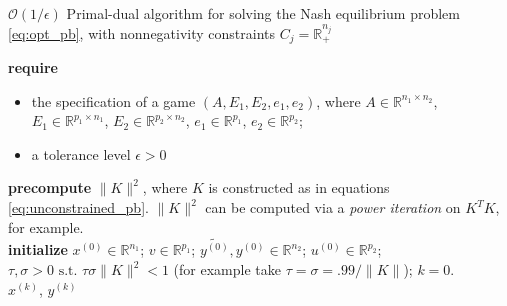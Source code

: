 \documentclass{article} %
\begin{document}
\begin{algorithm}[htb]
  \caption{$\mathcal{O}(1/\epsilon)$ Primal-dual algorithm for solving the Nash equilibrium problem \eqref{eq:opt_pb}, with nonnegativity constraints $C_j = \mathbb{R}^{n_j}_+$}
  \textbf{require}
  \begin{itemize}
    \item the specification of a game $(A, E_1, E_2, e_1, e_2)$, where $A \in \mathbb{R}^{n_1 \times n_2}$,
  $E_1 \in \mathbb{R}^{p_1 \times n_1}$, $E_2 \in \mathbb{R}^{p_2 \times n_2}$, $e_1 \in \mathbb{R}^{p_1}$, $e_2 \in \mathbb{R}^{p_2}$;
      \item a tolerance level $\epsilon > 0$
  \end{itemize}
  \textbf{precompute} $\|K\|^2$, where $K$ is constructed as in equations \eqref{eq:unconstrained_pb}. $\|K\|^2$ can be computed via a \textit{power iteration} on $K^TK$, for example.\\
  \textbf{initialize}
  $x^{(0)} \in \mathbb{R}^{n_1}$; $v \in \mathbb{R}^{p_1}$; $\tilde{y^{(0)}}, y^{(0)} \in \mathbb{R}^{n_2}$; $u^{(0)} \in \mathbb{R}^{p_2}$; 
  $\tau, \sigma > 0 \text{ s.t. }\tau\sigma \|K\|^2 < 1$ (for example take $\tau = \sigma = .99/\|K\|$); $k = 0$.\\
   \Return $x^{(k)}$, $y^{(k)}$
  \label{Tab:algo_simplified}
\end{algorithm}
\end{document}
